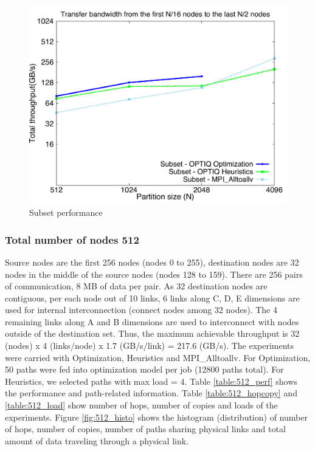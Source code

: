 \documentclass[letter]{article}
\begin{document}
\begin{figure}[h]
\vspace{-0.1in}
\centering
\includegraphics[scale=0.40]{report_figures/constantr_subset.pdf}
\vspace{-0.1in}
\caption{Subset performance}
\vspace{-0.1in}
\label{fig:patterns}
\end{figure}

\subsubsection {Total number of nodes 512}

Source nodes are the first 256 nodes (nodes 0 to 255), destination nodes are 32 nodes in the middle of the source nodes (nodes 128 to 159). There are 256 pairs of communication, 8 MB of data per pair. As 32 destination nodes are contiguous, per each node out of 10 links, 6 links along C, D, E dimensions are used for internal interconnection (connect nodes among 32 nodes). The 4 remaining links along A and B dimensions are used to interconnect with nodes outside of the destination set. Thus, the maximum achievable throughput is 32 (nodes) x 4 (links/node) x 1.7 (GB/s/link) = 217.6 (GB/s). The experiments were carried with Optimization, Heuristics and MPI\_Alltoallv. For Optimization, 50 paths were fed into optimization model per job (12800 paths total). For Heuristics, we selected paths with max load = 4. Table \ref{table:512_perf} shows the performance and path-related information. Table \ref{table:512_hopcopy} and \ref{table:512_load} show number of hops, number of copies and loads of the experiments. Figure \ref{fig:512_histo} shows the histogram (distribution) of number of hops, number of copies, number of paths sharing physical links and total amount of data traveling through a physical link.
\end{document}
